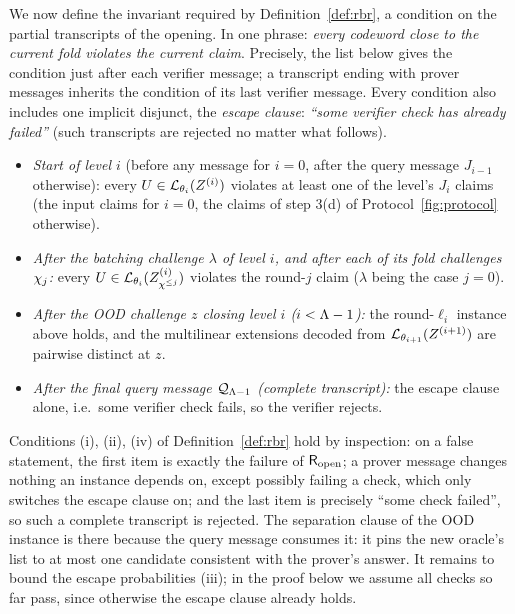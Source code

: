 We now define the invariant required by Definition~\ref{def:rbr}, a condition on the partial transcripts of the opening. In one phrase: \emph{every codeword close to the current fold violates the current claim}. Precisely, the list below gives the condition just after each verifier message; a transcript ending with prover messages inherits the condition of its last verifier message. Every condition also includes one implicit disjunct, the \emph{escape clause}: \emph{``some verifier check has already failed''} (such transcripts are rejected no matter what follows).
\begin{itemize}[itemsep=1pt]
\item \emph{Start of level $i$} (before any message for $i = 0$, after the query message $J_{i-1}$ otherwise): every $U \in \mathcal{L}_{\theta_i}(Z^{(i)})$ violates at least one of the level's $J_i$ claims (the input claims for $i = 0$, the claims of step 3(d) of Protocol~\ref{fig:protocol} otherwise).
\item \emph{After the batching challenge $\lambda$ of level $i$, and after each of its fold challenges $\chi_j$:} every $U \in \mathcal{L}_{\theta_i}(Z^{(i)}_{\chi^{\le j}})$ violates the round-$j$ claim ($\lambda$ being the case $j = 0$).
\item \emph{After the OOD challenge $z$ closing level $i$ ($i < \Lambda-1$):} the round-$\ell_i$ instance above holds, and the multilinear extensions decoded from $\mathcal{L}_{\theta_{i+1}}(Z^{(i+1)})$ are pairwise distinct at $z$.
\item \emph{After the final query message $\mathcal{Q}_{\Lambda-1}$ (complete transcript):} the escape clause alone, i.e.\ some verifier check fails, so the verifier rejects.
\end{itemize}
Conditions (i), (ii), (iv) of Definition~\ref{def:rbr} hold by inspection: on a false statement, the first item is exactly the failure of $\mathsf{R}_{\mathrm{open}}$; a prover message changes nothing an instance depends on, except possibly failing a check, which only switches the escape clause on; and the last item is precisely ``some check failed'', so such a complete transcript is rejected. The separation clause of the OOD instance is there because the query message consumes it: it pins the new oracle's list to at most one candidate consistent with the prover's answer. It remains to bound the escape probabilities (iii); in the proof below we assume all checks so far pass, since otherwise the escape clause already holds.

